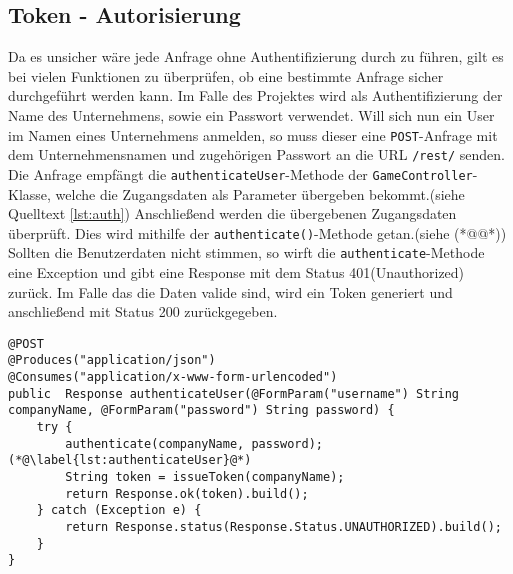 \subsection{Token - Autorisierung}

Da es unsicher wäre jede Anfrage ohne Authentifizierung durch zu führen, gilt es bei vielen Funktionen zu überprüfen, ob eine bestimmte Anfrage sicher durchgeführt werden kann.
Im Falle des Projektes wird als Authentifizierung der Name des Unternehmens, sowie ein Passwort verwendet. Will sich nun ein User im Namen eines Unternehmens anmelden, so muss dieser eine \texttt{POST}-Anfrage mit dem Unternehmensnamen und zugehörigen Passwort an die URL \texttt{/rest/} senden. 
Die Anfrage empfängt die \texttt{authenticateUser}-Methode der \texttt{GameController}-Klasse, welche die Zugangsdaten als Parameter übergeben bekommt.(siehe Quelltext \ref{lst:auth}) 
Anschließend werden die übergebenen Zugangsdaten überprüft. Dies wird mithilfe der \texttt{authenticate()}-Methode getan.(siehe (*@\label{lst:authenticateUser}@*))
Sollten die Benutzerdaten nicht stimmen, so wirft die \texttt{authenticate}-Methode eine Exception und gibt eine Response mit dem Status 401(Unauthorized) zurück. Im Falle das die Daten valide sind, wird ein Token generiert und anschließend mit Status 200 zurückgegeben.

\lstset{language=JAVA}
\begin{lstlisting}[float=htbp, caption={\texttt{authentivateUser() Methode der \texttt{GameController}-Klasse} }, label={lst:auth}]
@POST
@Produces("application/json")
@Consumes("application/x-www-form-urlencoded")
public  Response authenticateUser(@FormParam("username") String companyName, @FormParam("password") String password) {
	try {
		authenticate(companyName, password);  (*@\label{lst:authenticateUser}@*)
		String token = issueToken(companyName);
		return Response.ok(token).build();
	} catch (Exception e) {
		return Response.status(Response.Status.UNAUTHORIZED).build();
	}
}
\end{lstlisting}

